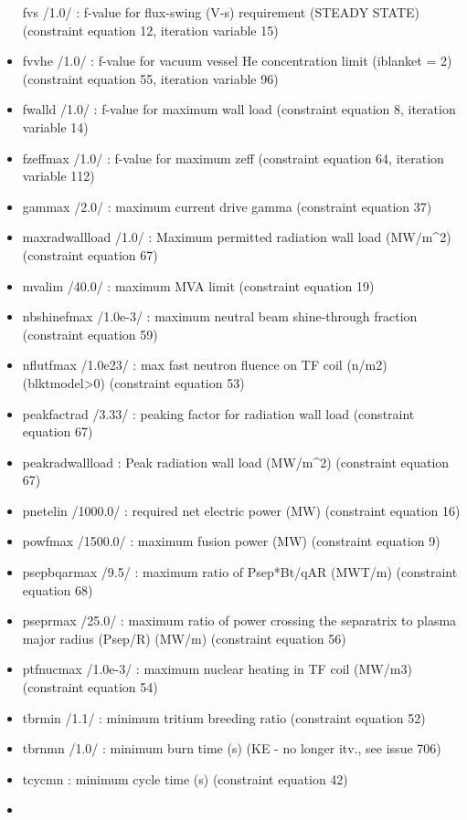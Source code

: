 \documentclass[]{article}
\begin{document}
\begin{itemize}
  fvs /1.0/ : f-value for flux-swing (V-s) requirement (STEADY STATE)
  (constraint equation 12, iteration variable 15)
\item
  fvvhe /1.0/ : f-value for vacuum vessel He concentration limit
  (iblanket = 2) (constraint equation 55, iteration variable 96)
\item
  fwalld /1.0/ : f-value for maximum wall load (constraint equation 8,
  iteration variable 14)
\item
  fzeffmax /1.0/ : f-value for maximum zeff (constraint equation 64,
  iteration variable 112)
\item
  gammax /2.0/ : maximum current drive gamma (constraint equation 37)
\item
  maxradwallload /1.0/ : Maximum permitted radiation wall load
  (MW/m\^{}2) (constraint equation 67)
\item
  mvalim /40.0/ : maximum MVA limit (constraint equation 19)
\item
  nbshinefmax /1.0e-3/ : maximum neutral beam shine-through fraction
  (constraint equation 59)
\item
  nflutfmax /1.0e23/ : max fast neutron fluence on TF coil (n/m2)
  (blktmodel\textgreater{}0) (constraint equation 53)
\item
  peakfactrad /3.33/ : peaking factor for radiation wall load
  (constraint equation 67)
\item
  peakradwallload : Peak radiation wall load (MW/m\^{}2) (constraint
  equation 67)
\item
  pnetelin /1000.0/ : required net electric power (MW) (constraint
  equation 16)
\item
  powfmax /1500.0/ : maximum fusion power (MW) (constraint equation 9)
\item
  psepbqarmax /9.5/ : maximum ratio of Psep*Bt/qAR (MWT/m) (constraint
  equation 68)
\item
  pseprmax /25.0/ : maximum ratio of power crossing the separatrix to
  plasma major radius (Psep/R) (MW/m) (constraint equation 56)
\item
  ptfnucmax /1.0e-3/ : maximum nuclear heating in TF coil (MW/m3)
  (constraint equation 54)
\item
  tbrmin /1.1/ : minimum tritium breeding ratio (constraint equation 52)
\item
  tbrnmn /1.0/ : minimum burn time (s) (KE - no longer itv., see issue
  706)
\item
  tcycmn : minimum cycle time (s) (constraint equation 42)
\item

\end{itemize}
\end{document}
